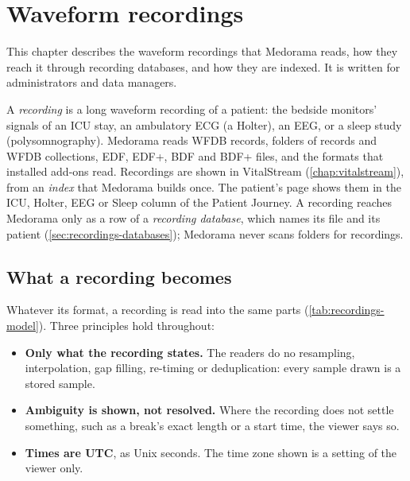 \chapter{Waveform recordings}
\label{chap:recordings}

This chapter describes the waveform recordings that Medorama reads, how they reach it through
recording databases, and how they are indexed. It is written for administrators and data
managers.

A \emph{recording} is a long waveform recording of a patient: the bedside monitors' signals of an
ICU stay, an ambulatory ECG (a Holter), an EEG, or a sleep study (polysomnography). Medorama
reads WFDB records, folders of records and WFDB collections, EDF, EDF+, BDF and BDF+ files, and
the formats that installed add-ons read. Recordings are shown in VitalStream
(\cref{chap:vitalstream}), from an \emph{index} that Medorama builds once. The patient's page
shows them in the ICU, Holter, EEG or Sleep column of the Patient Journey. A recording reaches
Medorama only as a row of a \emph{recording database}, which names its file and its patient
(\cref{sec:recordings-databases}); Medorama never scans folders for recordings.

\section{What a recording becomes}
\label{sec:recordings-model}

Whatever its format, a recording is read into the same parts (\cref{tab:recordings-model}).
Three principles hold throughout:
\begin{itemize}
\item \textbf{Only what the recording states.} The readers do no resampling, interpolation, gap
  filling, re-timing or deduplication: every sample drawn is a stored sample.
\item \textbf{Ambiguity is shown, not resolved.} Where the recording does not settle something,
  such as a break's exact length or a start time, the viewer says so.
\item \textbf{Times are UTC}, as Unix seconds. The time zone shown is a setting of the viewer
  only.
\end{itemize}

